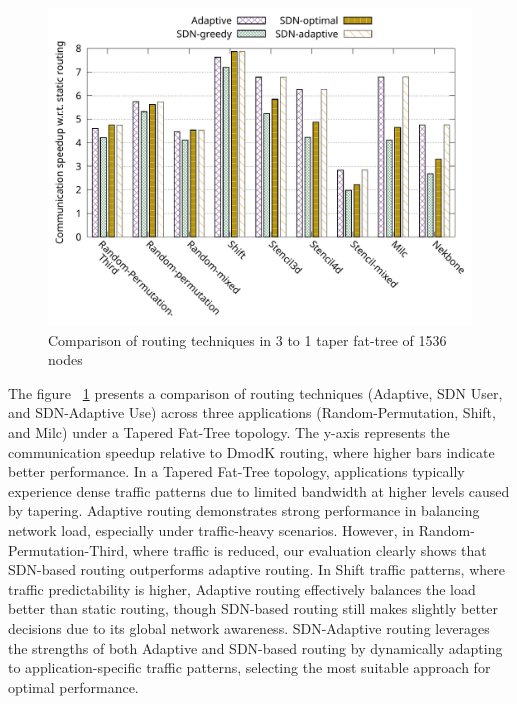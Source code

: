 \begin{figure}[h]
  \centering
  \includegraphics[width=\columnwidth]{./figs_4/routing_taper.pdf}
  \caption{Comparison of routing techniques in 3 to 1 taper fat-tree of 1536 nodes}
  \label{fig:routing_taper}
\end{figure}


The figure ~\ref{fig:routing_taper} presents a comparison of routing techniques (Adaptive, SDN User, and SDN-Adaptive Use) across three applications (Random-Permutation, Shift, and Milc) under a Tapered Fat-Tree topology. The y-axis represents the communication speedup relative to DmodK routing, where higher bars indicate better performance. In a Tapered Fat-Tree topology, applications typically experience dense traffic patterns due to limited bandwidth at higher levels caused by tapering. Adaptive routing demonstrates strong performance in balancing network load, especially under traffic-heavy scenarios. However, in Random-Permutation-Third, where traffic is reduced, our evaluation clearly shows that SDN-based routing outperforms adaptive routing. In Shift traffic patterns, where traffic predictability is higher, Adaptive routing effectively balances the load better than static routing, though SDN-based routing still makes slightly better decisions due to its global network awareness. SDN-Adaptive routing leverages the strengths of both Adaptive and SDN-based routing by dynamically adapting to application-specific traffic patterns, selecting the most suitable approach for optimal performance. 

